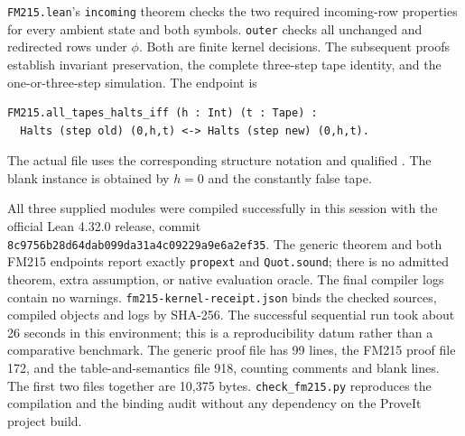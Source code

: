 \texttt{FM215.lean}'s \texttt{incoming} theorem checks the two required
incoming-row properties for every ambient state and both symbols.
\texttt{outer} checks all unchanged and redirected rows under $\phi$.
Both are finite kernel decisions. The subsequent proofs establish
invariant preservation, the complete three-step tape identity, and the
one-or-three-step simulation. The endpoint is
\begin{verbatim}
FM215.all_tapes_halts_iff (h : Int) (t : Tape) :
  Halts (step old) (0,h,t) <-> Halts (step new) (0,h,t).
\end{verbatim}
The actual file uses the corresponding structure notation and qualified
. The blank instance is obtained by
$h=0$ and the constantly false tape.

All three supplied modules were compiled successfully in this session
with the official Lean 4.32.0 release, commit
\texttt{8c9756b28d64dab099da31a4c09229a9e6a2ef35}. The generic theorem
and both FM215 endpoints report exactly \texttt{propext} and
\texttt{Quot.sound}; there is no admitted theorem, extra assumption, or
native evaluation oracle. The final compiler logs contain no warnings.
\texttt{fm215-kernel-receipt.json} binds the checked sources, compiled
objects and logs by SHA-256. The successful sequential run took about
26 seconds in this environment; this is a reproducibility datum rather
than a comparative benchmark. The generic proof file has 99 lines,
the FM215 proof file 172, and the table-and-semantics file 918, counting
comments and blank lines. The first two files together are 10,375 bytes.
\texttt{check\_fm215.py} reproduces the compilation and the binding audit
without any dependency on the ProveIt project build.

